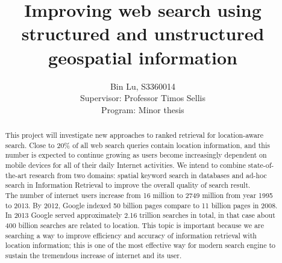 \documentclass[a4paper,11pt]{article}
\title{Improving web search using structured and unstructured geospatial information}
\author{Bin Lu, S3360014\\Supervisor: Professor Timos Sellis\\Program: Minor thesis}
\begin{document}
\maketitle
\begin{abstract}
This project will investigate new approaches to ranked retrieval for location-aware search. Close to 20\% of all web search queries contain location information, and this number is expected to continue growing as users become increasingly dependent on mobile devices for all of their daily Internet activities. We intend to combine state-of-the-art research from two domains: spatial keyword search in databases and ad-hoc search in Information Retrieval to improve the overall quality of search result.\\
The number of internet users increase from 16 million to 2749 million from year 1995 to 2013. By 2012, Google indexed 50 billion pages compare to 11 billion pages in 2008. In 2013 Google served approximately 2.16 trillion searches in total, in that case about 400 billion searches are related to location. This topic is important because we are searching a way to improve efficiency and accuracy of information retrieval with location information; this is one of the most effective way for modern search engine to sustain the tremendous increase of internet and its user. 
\end{abstract}
\end{document}
